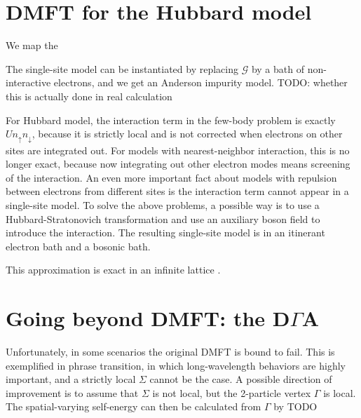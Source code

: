 \documentclass[hyperref, a4paper]{article}
\begin{document}
\section{DMFT for the Hubbard model}

We map the 

The single-site model can be instantiated by replacing $\mathcal{G}$ by a bath of non-interactive electrons,
and we get an Anderson impurity model.
TODO: whether this is actually done in real calculation

For Hubbard model, the interaction term in the few-body problem is exactly $U n_{\uparrow} n_{\downarrow}$,
because it is strictly local and is not corrected 
when electrons on other sites are integrated out.
For models with nearest-neighbor interaction,
this is no longer exact,
because now integrating out other electron modes 
means screening of the interaction.
An even more important fact about models with repulsion between electrons from different sites 
is the interaction term cannot appear in a single-site model.
To solve the above problems, 
a possible way is to use a Hubbard-Stratonovich transformation 
and use an auxiliary boson field to introduce the interaction.
The resulting single-site model 
is in an itinerant electron bath 
and a bosonic bath.


This approximation is exact in an infinite lattice \cite{PhysRevB.45.6479}.

\section{Going beyond DMFT: the D$\Gamma$A}

Unfortunately, in some scenarios the original DMFT is bound to fail.
This is exemplified in phrase transition,
in which long-wavelength behaviors are highly important,
and a strictly local $\Sigma$ cannot be the case.
A possible direction of improvement is 
to assume that $\Sigma$ is not local,
but the 2-particle vertex $\Gamma$ is local.
The spatial-varying self-energy can then be calculated from $\Gamma$ by TODO

\printbibliography
\end{document}
